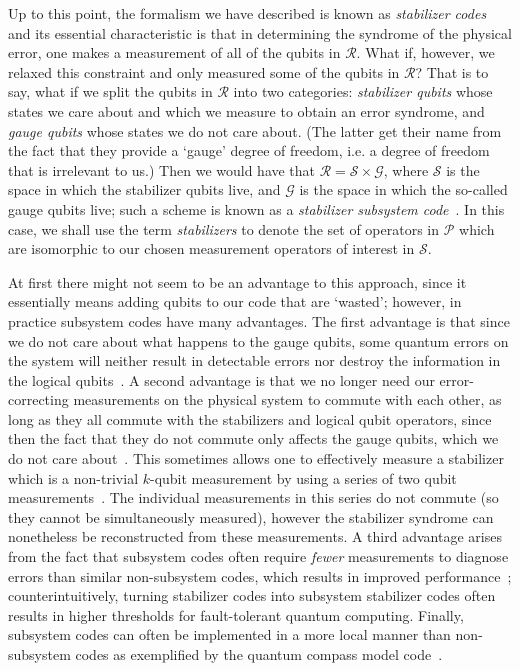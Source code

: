 \documentclass[12pt]{amsbook}
\theoremstyle{plain}
\theoremstyle{definition}
\theoremstyle{remark}
\begin{document}
Up to this point, the formalism we have described is known as \emph{stabilizer codes}~\cite{Gottesman:96a,Gottesman:97a,Calderbank:97a,Calderbank:97b} and its essential characteristic is that in determining the syndrome of the physical error, one makes a measurement of all of the qubits in $\mathscr{R}$. What if, however, we relaxed this constraint and only measured some of the qubits in $\mathscr{R}$?  That is to say, what if we split the qubits in $\mathscr{R}$ into two categories: \emph{stabilizer
qubits} whose states we care about and which we measure to obtain an error syndrome, and \emph{gauge
qubits} whose states we do not care about.  (The latter get their name
from the fact that they provide a `gauge' degree of freedom, i.e. a
degree of freedom that is irrelevant to us.)  Then we would have that
$\mathscr{R}=\mathscr{S}\times \mathscr{G}$, where $\mathscr{S}$ is
the space in which the stabilizer qubits live, and $\mathscr{G}$ is
the space in which the so-called gauge qubits live; such a scheme is
known as a \emph{stabilizer subsystem code}~\cite{Poulin:05a}.  In this case, we shall use the term
\emph{stabilizers} to denote the set of operators in $\mathscr{P}$ which are isomorphic to our chosen measurement operators of interest in $\mathscr{S}$.

At first there might not seem to be an advantage to this approach, since it essentially means adding qubits to our code that are
`wasted'; however, in practice subsystem codes have many advantages.  The first advantage is that since we do not care about what happens to the gauge qubits, some quantum errors on the system will neither result in detectable errors nor destroy the information in the logical qubits~\cite{Poulin:05a,Kribs:05a,Kribs:05b,Nielsen:05a,Kribs:06a,Bacon:06a}.  A second advantage is that we no longer need our error-correcting measurements on the physical system to commute with each other, as long as they all commute with the stabilizers and logical qubit operators, since then the fact that they do not commute only affects the gauge qubits, which we do not care about~\cite{Aliferis:07a}.  This sometimes allows one to effectively measure a stabilizer which is a non-trivial $k$-qubit measurement by using a series of two qubit measurements~\cite{Aliferis:07a}.  The individual measurements in this series do not commute (so they cannot be simultaneously measured), however the stabilizer syndrome can nonetheless be reconstructed from these measurements.  A third advantage arises from the fact that subsystem codes often require {\em fewer} measurements to diagnose errors than similar non-subsystem codes, which results in improved performance~\cite{Aliferis:07a,Cross:07a};  counterintuitively, turning stabilizer codes into subsystem stabilizer codes often results in higher thresholds for fault-tolerant quantum computing.  Finally, subsystem codes can often be implemented in a more local manner than non-subsystem codes as exemplified by the quantum compass model code~\cite{Bacon:06a,Aliferis:07a}.
\end{document}
